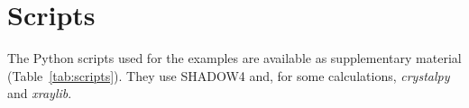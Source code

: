 \documentclass{iucr}
\begin{document}








\section{Scripts}\label{sec:scripts}

The Python scripts used for the examples are available as supplementary material (Table~\ref{tab:scripts}). They use SHADOW4 and, for some calculations, {\it crystalpy} and {\it xraylib}.
\end{document}
